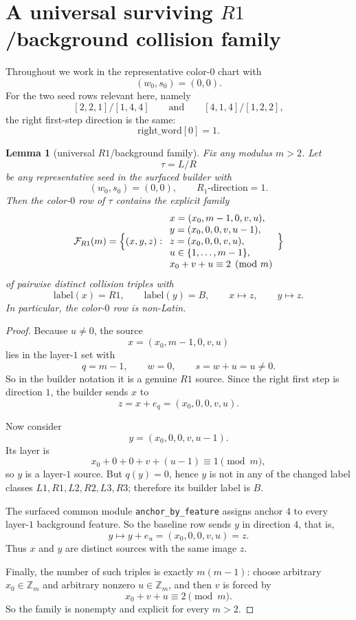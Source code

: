 \documentclass[11pt]{article}
\newtheorem{lemma}{Lemma}
\begin{document}
\section*{A universal surviving $R1$/background collision family}
Throughout we work in the representative color-$0$ chart with
\[
(w_0,s_0)=(0,0).
\]
For the two seed rows relevant here, namely
\[
[2,2,1]/[1,4,4]
\qquad\text{and}\qquad
[4,1,4]/[1,2,2],
\]
the right first-step direction is the same:
\[
\text{right\_word}[0]=1.
\]

\begin{lemma}[universal $R1$/background family]
\label{lem:universal-R1-family}
Fix any modulus $m>2$.  Let
\[
\tau = L/R
\]
be any representative seed in the surfaced builder with
\[
(w_0,s_0)=(0,0),
\qquad
R_1\text{-direction}=1.
\]
Then the color-$0$ row of $\tau$ contains the explicit family
\[
\mathcal F_{R1}(m)
=
\Bigl\{
(x,y,z):
\begin{array}{l}
 x=(x_0,m-1,0,v,u),\\
 y=(x_0,0,0,v,u-1),\\
 z=(x_0,0,0,v,u),\\
 u\in\{1,\dots,m-1\},\\
 x_0+v+u\equiv 2\pmod m
\end{array}
\Bigr\}
\]
of pairwise distinct collision triples with
\[
\mathrm{label}(x)=R1,
\qquad
\mathrm{label}(y)=B,
\qquad
x\mapsto z,
\qquad
y\mapsto z.
\]
In particular, the color-$0$ row is non-Latin.
\end{lemma}

\begin{proof}
Because $u\neq 0$, the source
\[
x=(x_0,m-1,0,v,u)
\]
lies in the layer-$1$ set with
\[
q=m-1,
\qquad
w=0,
\qquad
s=w+u=u\neq 0.
\]
So in the builder notation it is a genuine $R1$ source.  Since the right first
step is direction $1$, the builder sends $x$ to
\[
z=x+e_q=(x_0,0,0,v,u).
\]

Now consider
\[
y=(x_0,0,0,v,u-1).
\]
Its layer is
\[
x_0+0+0+v+(u-1)\equiv 1 \pmod m,
\]
so $y$ is a layer-$1$ source.  But $q(y)=0$, hence $y$ is not in any of the
changed label classes $L1,R1,L2,R2,L3,R3$; therefore its builder label is $B$.

The surfaced common module \texttt{anchor\_by\_feature} assigns anchor $4$ to every
layer-$1$ background feature.  So the baseline row sends $y$ in direction $4$,
that is,
\[
y\mapsto y+e_u=(x_0,0,0,v,u)=z.
\]
Thus $x$ and $y$ are distinct sources with the same image $z$.

Finally, the number of such triples is exactly $m(m-1)$: choose arbitrary
$x_0\in\mathbb Z_m$ and arbitrary nonzero $u\in\mathbb Z_m$, and then $v$ is forced by
\[
x_0+v+u\equiv 2 \pmod m.
\]
So the family is nonempty and explicit for every $m>2$.
\end{proof}
\end{document}
